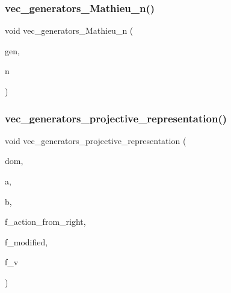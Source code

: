 \mbox{\label{perm__group__gens_8_c_a82bad2f129ab5f3daafc1a84a29d5dba}} 
\subsubsection{\texorpdfstring{vec\+\_\+generators\+\_\+\+Mathieu\+\_\+n()}{vec\_generators\_Mathieu\_n()}}
{\footnotesize\ttfamily void vec\+\_\+generators\+\_\+\+Mathieu\+\_\+n (\begin{DoxyParamCaption}\item[{\mbox{\hyperlink{class_vector}{Vector}} \&}]{gen,  }\item[{\mbox{\hyperlink{galois_8h_a09fddde158a3a20bd2dcadb609de11dc}{I\+NT}}}]{n }\end{DoxyParamCaption})}

\mbox{\label{perm__group__gens_8_c_a265645d026830ea3330152d82df495ce}} 
\subsubsection{\texorpdfstring{vec\+\_\+generators\+\_\+projective\+\_\+representation()}{vec\_generators\_projective\_representation()}}
{\footnotesize\ttfamily void vec\+\_\+generators\+\_\+projective\+\_\+representation (\begin{DoxyParamCaption}\item[{\mbox{\hyperlink{classdomain}{domain}} $\ast$}]{dom,  }\item[{\mbox{\hyperlink{class_vector}{Vector}} \&}]{a,  }\item[{\mbox{\hyperlink{class_vector}{Vector}} \&}]{b,  }\item[{\mbox{\hyperlink{galois_8h_a09fddde158a3a20bd2dcadb609de11dc}{I\+NT}}}]{f\+\_\+action\+\_\+from\+\_\+right,  }\item[{\mbox{\hyperlink{galois_8h_a09fddde158a3a20bd2dcadb609de11dc}{I\+NT}}}]{f\+\_\+modified,  }\item[{\mbox{\hyperlink{galois_8h_a09fddde158a3a20bd2dcadb609de11dc}{I\+NT}}}]{f\+\_\+v }\end{DoxyParamCaption})}

